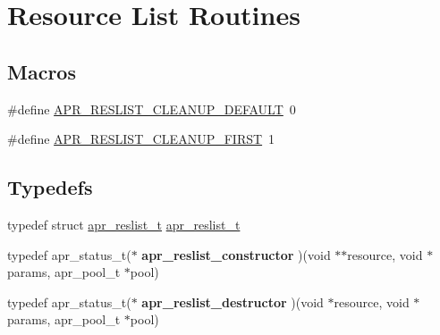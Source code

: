 \hypertarget{group___a_p_r___util___r_l}{\section{Resource List Routines}
\label{group___a_p_r___util___r_l}
}
\subsection*{Macros}
\begin{DoxyCompactItemize}
\item 
\#define \hyperlink{group___a_p_r___util___r_l_gae442d99e6a2eef4a4957f0360822fcac}{A\-P\-R\-\_\-\-R\-E\-S\-L\-I\-S\-T\-\_\-\-C\-L\-E\-A\-N\-U\-P\-\_\-\-D\-E\-F\-A\-U\-L\-T}~0
\item 
\#define \hyperlink{group___a_p_r___util___r_l_gad93b2c229d154c8f6a5c9dfcd7488756}{A\-P\-R\-\_\-\-R\-E\-S\-L\-I\-S\-T\-\_\-\-C\-L\-E\-A\-N\-U\-P\-\_\-\-F\-I\-R\-S\-T}~1
\end{DoxyCompactItemize}
\subsection*{Typedefs}
\begin{DoxyCompactItemize}
\item 
typedef struct \hyperlink{group___a_p_r___util___r_l_ga670f6719dfeffe1037e063eaab7b82ac}{apr\-\_\-reslist\-\_\-t} \hyperlink{group___a_p_r___util___r_l_ga670f6719dfeffe1037e063eaab7b82ac}{apr\-\_\-reslist\-\_\-t}
\item 
\hypertarget{group___a_p_r___util___r_l_gab43e73c2fb526476d3e56d51f5aa214c}{typedef apr\-\_\-status\-\_\-t($\ast$ {\bfseries apr\-\_\-reslist\-\_\-constructor} )(void $\ast$$\ast$resource, void $\ast$params, apr\-\_\-pool\-\_\-t $\ast$pool)}\label{group___a_p_r___util___r_l_gab43e73c2fb526476d3e56d51f5aa214c}

\item 
\hypertarget{group___a_p_r___util___r_l_ga60813240d319787f0430ae3171af838a}{typedef apr\-\_\-status\-\_\-t($\ast$ {\bfseries apr\-\_\-reslist\-\_\-destructor} )(void $\ast$resource, void $\ast$params, apr\-\_\-pool\-\_\-t $\ast$pool)}\label{group___a_p_r___util___r_l_ga60813240d319787f0430ae3171af838a}

\end{DoxyCompactItemize}
